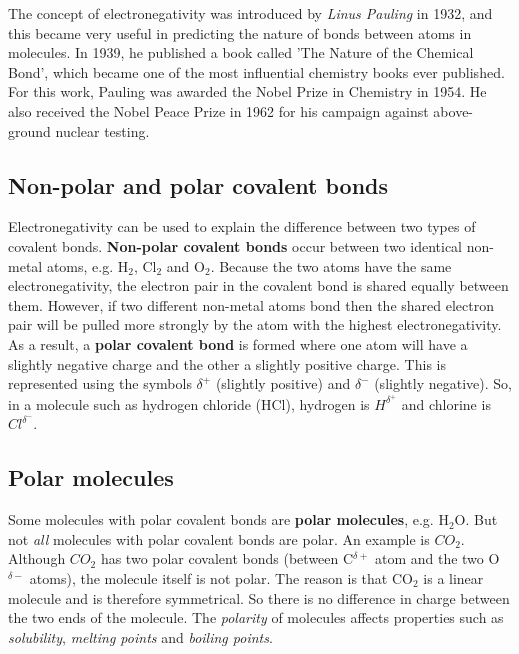 \begin{IFact}{
The concept of electronegativity was introduced by \textit{Linus Pauling} in 1932, and this became very useful in predicting the nature of bonds between atoms in molecules. In 1939, he published a book called 'The Nature of the Chemical Bond', which became one of the most influential chemistry books ever published. For this work, Pauling was awarded the Nobel Prize in Chemistry in 1954. He also received the Nobel Peace Prize in 1962 for his campaign against above-ground nuclear testing.
}
\end{IFact}

\subsection{Non-polar and polar covalent bonds}

Electronegativity can be used to explain the difference between two
types of covalent bonds. \textbf{Non-polar covalent bonds} occur between two
identical non-metal atoms, e.g. H$_2$, Cl$_2$ and O$_2$. Because the two atoms
have the same electronegativity, the electron pair in the covalent
bond is shared equally between them. However, if two different
non-metal atoms bond then the shared electron pair will be pulled more
strongly by the atom with the highest electronegativity. As a result, a \textbf{polar covalent bond} is formed where one atom will have a slightly negative charge and the other a slightly
positive charge. This is represented using the symbols $\delta^{+}$ (slightly positive) and $\delta^{-}$ (slightly negative). So, in a molecule such as hydrogen chloride (HCl), hydrogen is $H^{\delta^{+}}$ and chlorine is $Cl^{\delta^{-}}$.

\subsection{Polar molecules}

Some molecules with polar covalent bonds are \textbf{polar molecules},
e.g. H$_2$O. But not \textit{all} molecules with polar covalent bonds are polar. An example is $CO_{2}$. Although $CO_{2}$ has two polar covalent bonds (between
C$^{\delta +}$ atom and the two O$^{\delta -}$ atoms), the molecule itself is not polar. The
reason is that CO$_2$ is a linear molecule and is therefore
symmetrical. So there is no difference in charge between the two ends
of the molecule. The \textit{polarity} of molecules affects properties such as \textit{solubility}, \textit{melting points} and \textit{boiling points}.

